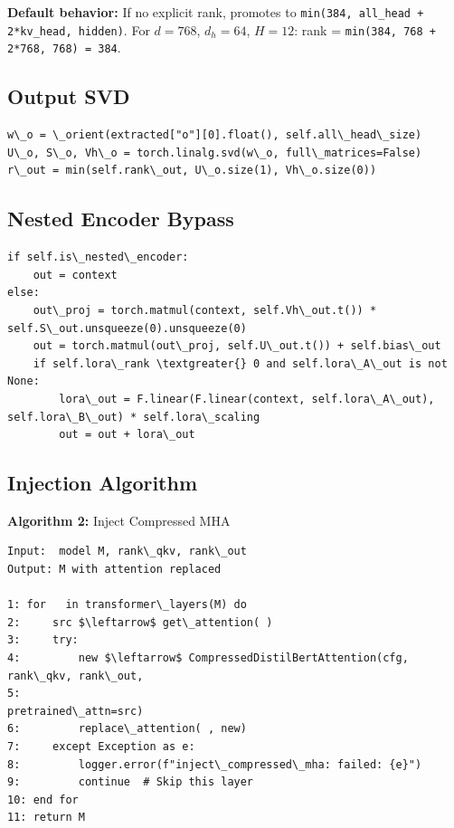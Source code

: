 \textbf{Default behavior:} If no explicit rank, promotes to \texttt{min(384, all\_head + 2*kv\_head, hidden)}. 
For $d = 768$, $d_h = 64$, $H = 12$: rank = \texttt{min(384, 768 + 2*768, 768) = 384}.

\subsection{Output SVD}

\begin{lstlisting}
w\_o = \_orient(extracted["o"][0].float(), self.all\_head\_size)
U\_o, S\_o, Vh\_o = torch.linalg.svd(w\_o, full\_matrices=False)
r\_out = min(self.rank\_out, U\_o.size(1), Vh\_o.size(0))
\end{lstlisting}

\subsection{Nested Encoder Bypass}

\begin{lstlisting}
if self.is\_nested\_encoder:
    out = context
else:
    out\_proj = torch.matmul(context, self.Vh\_out.t()) * self.S\_out.unsqueeze(0).unsqueeze(0)
    out = torch.matmul(out\_proj, self.U\_out.t()) + self.bias\_out
    if self.lora\_rank \textgreater{} 0 and self.lora\_A\_out is not None:
        lora\_out = F.linear(F.linear(context, self.lora\_A\_out), self.lora\_B\_out) * self.lora\_scaling
        out = out + lora\_out
\end{lstlisting}

\subsection{Injection Algorithm}

\textbf{Algorithm 2:} Inject Compressed MHA
\begin{lstlisting}
Input:  model M, rank\_qkv, rank\_out
Output: M with attention replaced

1: for   in transformer\_layers(M) do
2:     src $\leftarrow$ get\_attention( )
3:     try:
4:         new $\leftarrow$ CompressedDistilBertAttention(cfg, rank\_qkv, rank\_out, 
5:                                                pretrained\_attn=src)
6:         replace\_attention( , new)
7:     except Exception as e:
8:         logger.error(f"inject\_compressed\_mha: failed: {e}")
9:         continue  # Skip this layer
10: end for
11: return M
\end{lstlisting}

